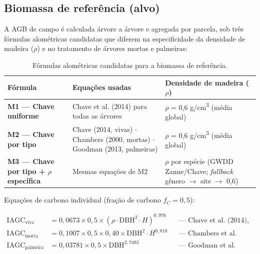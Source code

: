 \subsection{Biomassa de referência (alvo)}
\label{sec:biomassa}

A AGB de campo é calculada árvore a árvore e agregada por parcela, sob três
fórmulas alométricas candidatas que diferem na especificidade da densidade de
madeira ($\rho$) e no tratamento de árvores mortas e palmeiras:

\begin{table}[H]
  \centering
  \caption{Fórmulas alométricas candidatas para a biomassa de referência.}
  \label{tab:formulas}
  \begin{tabular}{p{3.2cm}p{6.2cm}p{4.6cm}}
    \toprule
    \textbf{Fórmula} & \textbf{Equações usadas} & \textbf{Densidade de madeira ($\rho$)} \\
    \midrule
    \textbf{M1 --- Chave uniforme} & Chave et al. (2014) para todas as árvores &
      $\rho$ = 0,6 g/cm\textsuperscript{3} (média global) \\
    \textbf{M2 --- Chave por tipo} & Chave (2014, vivas) $\cdot$ Chambers (2000,
      mortas) $\cdot$ Goodman (2013, palmeiras) & $\rho$ = 0,6 g/cm\textsuperscript{3}
      (média global) \\
    \textbf{M3 --- Chave por tipo + $\rho$ específica} & Mesmas equações de M2 &
      $\rho$ por espécie (GWDD Zanne/Chave; \textit{fallback} gênero
      $\rightarrow$ site $\rightarrow$ 0,6) \\
    \bottomrule
  \end{tabular}
\end{table}

Equações de carbono individual (fração de carbono $f_C = 0,5$):

\begin{align}
  \text{IAGC}_{\text{viva}}     &= 0{,}0673 \times 0{,}5 \times
     \left(\rho \cdot \text{DBH}^2 \cdot H\right)^{0{,}976}
     && \text{--- Chave et al. (2014), Eq.~7} \\
  \text{IAGC}_{\text{morta}}    &= 0{,}1007 \times 0{,}5 \times 0{,}40 \times
     \text{DBH}^2 \cdot H^{0{,}818}
     && \text{--- Chambers et al. (2000)} \\
  \text{IAGC}_{\text{palmeira}} &= 0{,}03781 \times 0{,}5 \times
     \text{DBH}^{2{,}7483}
     && \text{--- Goodman et al. (2013)}
\end{align}


